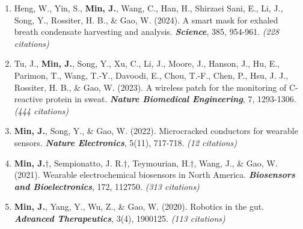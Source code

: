 \documentclass[11pt,a4paper]{article}
\begin{document}
\begin{enumerate}[leftmargin=*, itemsep=3pt, parsep=0pt, topsep=2pt]
  \item Heng, W., Yin, S., \textbf{Min, J.}, Wang, C., Han, H., Shirzaei Sani, E., Li, J., Song, Y., Rossiter, H. B., \& Gao, W. (2024). A smart mask for exhaled breath condensate harvesting and analysis. \textbf{\textit{Science}}, 385, 954-961. \textit{(228 citations)}
  \item Tu, J., \textbf{Min, J.}, Song, Y., Xu, C., Li, J., Moore, J., Hanson, J., Hu, E., Parimon, T., Wang, T.-Y., Davoodi, E., Chou, T.-F., Chen, P., Hsu, J. J., Rossiter, H. B., \& Gao, W. (2023). A wireless patch for the monitoring of C-reactive protein in sweat. \textbf{\textit{Nature Biomedical Engineering}}, 7, 1293-1306. \textit{(444 citations)}
  \item \textbf{Min, J.}, Song, Y., \& Gao, W. (2022). Microcracked conductors for wearable sensors. \textbf{\textit{Nature Electronics}}, 5(11), 717-718. \textit{(12 citations)}
  \item \textbf{Min, J.}$\dagger$, Sempionatto, J. R.$\dagger$, Teymourian, H.$\dagger$, Wang, J., \& Gao, W. (2021). Wearable electrochemical biosensors in North America. \textbf{\textit{Biosensors and Bioelectronics}}, 172, 112750. \textit{(313 citations)}
  \item \textbf{Min, J.}, Yang, Y., Wu, Z., \& Gao, W. (2020). Robotics in the gut. \textbf{\textit{Advanced Therapeutics}}, 3(4), 1900125. \textit{(113 citations)}
\end{enumerate}
\end{document}
